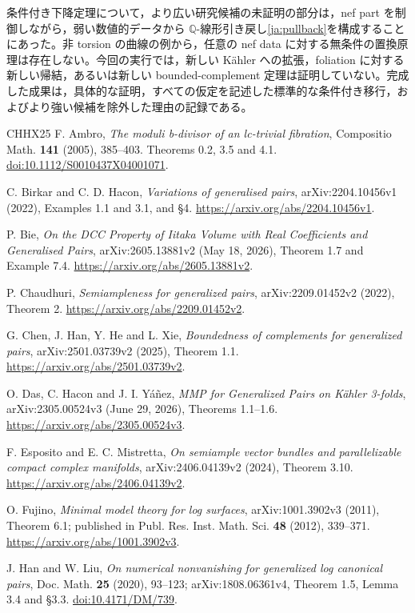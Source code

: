 \documentclass[12pt]{amsart}
\theoremstyle{definition}
\theoremstyle{remark}
\numberwithin{equation}{section}
\newcommand{\Q}{\mathbb{Q}}
\begin{document}
条件付き下降定理について，より広い研究候補の未証明の部分は，nef part を制御しながら，弱い数値的データから $\Q$-線形引き戻し\eqref{ja:pullback}を構成することにあった。非 torsion の曲線の例から，任意の nef data に対する無条件の置換原理は存在しない。今回の実行では，新しい K\"ahler への拡張，foliation に対する新しい帰結，あるいは新しい bounded-complement 定理は証明していない。完成した成果は，具体的な証明，すべての仮定を記述した標準的な条件付き移行，およびより強い候補を除外した理由の記録である。
\begin{thebibliography}{CHHX25}
F. Ambro, \emph{The moduli b-divisor of an lc-trivial fibration}, Compositio Math. \textbf{141} (2005), 385--403. Theorems 0.2, 3.5 and 4.1. \href{https://doi.org/10.1112/S0010437X04001071}{doi:10.1112/S0010437X04001071}.

C. Birkar and C. D. Hacon, \emph{Variations of generalised pairs}, arXiv:2204.10456v1 (2022), Examples 1.1 and 3.1, and \S4. \url{https://arxiv.org/abs/2204.10456v1}.

P. Bie, \emph{On the DCC Property of Iitaka Volume with Real Coefficients and Generalised Pairs}, arXiv:2605.13881v2 (May 18, 2026), Theorem 1.7 and Example 7.4. \url{https://arxiv.org/abs/2605.13881v2}.

P. Chaudhuri, \emph{Semiampleness for generalized pairs}, arXiv:2209.01452v2 (2022), Theorem 2. \url{https://arxiv.org/abs/2209.01452v2}.

G. Chen, J. Han, Y. He and L. Xie, \emph{Boundedness of complements for generalized pairs}, arXiv:2501.03739v2 (2025), Theorem 1.1. \url{https://arxiv.org/abs/2501.03739v2}.

O. Das, C. Hacon and J. I. Y\'a\~nez, \emph{MMP for Generalized Pairs on K\"ahler 3-folds}, arXiv:2305.00524v3 (June 29, 2026), Theorems 1.1--1.6. \url{https://arxiv.org/abs/2305.00524v3}.

F. Esposito and E. C. Mistretta, \emph{On semiample vector bundles and parallelizable compact complex manifolds}, arXiv:2406.04139v2 (2024), Theorem 3.10. \url{https://arxiv.org/abs/2406.04139v2}.

O. Fujino, \emph{Minimal model theory for log surfaces}, arXiv:1001.3902v3 (2011), Theorem 6.1; published in Publ. Res. Inst. Math. Sci. \textbf{48} (2012), 339--371. \url{https://arxiv.org/abs/1001.3902v3}.

J. Han and W. Liu, \emph{On numerical nonvanishing for generalized log canonical pairs}, Doc. Math. \textbf{25} (2020), 93--123; arXiv:1808.06361v4, Theorem 1.5, Lemma 3.4 and \S3.3. \href{https://doi.org/10.4171/DM/739}{doi:10.4171/DM/739}.


\end{thebibliography}
\end{document}
